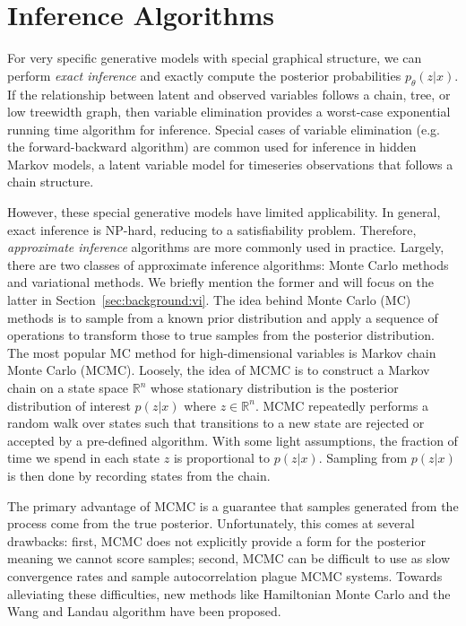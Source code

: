 \section{Inference Algorithms}
\label{sec:background:inference}

For very specific generative models with special graphical structure, we can perform \textit{exact inference} and exactly compute the posterior probabilities $p_\theta(z|x)$. If the relationship between latent and observed variables follows a chain, tree, or low treewidth graph, then variable elimination provides a worst-case exponential running time algorithm for inference. Special cases of variable elimination (e.g. the forward-backward algorithm) are common used for inference in hidden Markov models, a latent variable model for timeseries observations that follows a chain structure.

However, these special generative models have limited applicability. In general, exact inference is NP-hard, reducing to a satisfiability problem. Therefore, \textit{approximate inference} algorithms are more commonly used in practice. Largely, there are two classes of approximate inference algorithms: Monte Carlo methods and variational methods. We briefly mention the former and will focus on the latter in Section~\ref{sec:background:vi}. The idea behind Monte Carlo (MC) methods is to sample from a known prior distribution and apply a sequence of operations to transform those to true samples from the posterior distribution. The most popular MC method for high-dimensional variables is Markov chain Monte Carlo (MCMC). Loosely, the idea of MCMC is to construct a Markov chain on a state space $\mathbb{R}^n$ whose stationary distribution is the posterior distribution of interest $p(z|x)$ where $z \in \mathbb{R}^n$. MCMC repeatedly performs a random walk over states such that transitions to a new state are rejected or accepted by a pre-defined algorithm. With some light assumptions, the fraction of time we spend in each state $z$ is proportional to $p(z|x)$. Sampling from $p(z|x)$ is then done by recording states from the chain. 

The primary advantage of MCMC is a guarantee that samples generated from the process come from the true posterior. Unfortunately, this comes at several drawbacks: first, MCMC does not explicitly provide a form for the posterior meaning we cannot score samples; second, MCMC can be difficult to use as slow convergence rates and sample autocorrelation plague MCMC systems. Towards alleviating these difficulties, new methods like Hamiltonian Monte Carlo  \cite{neal2011mcmc,hoffman2014no} and the Wang and Landau algorithm \cite{wang2001efficient} have been proposed.

